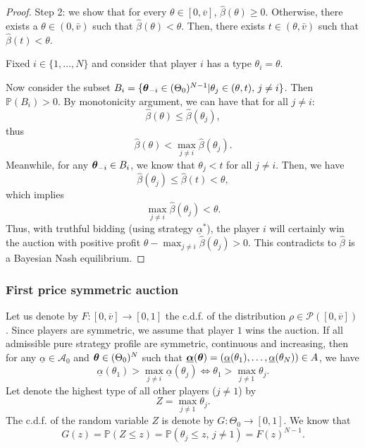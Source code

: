 \begin{proof}
	

	Step 2: we show that for every $\theta \in [0,\overline{v}]$, $\hat{\beta}(\theta) \geq 0$. Otherwise, there exists a $\theta \in (0, \bar{v})$ such that $\hat{\beta}(\theta) < \theta$.
	Then, there exists $t \in (\theta, \bar{v})$ such that  $\hat{\beta}(t) < \theta$.
	
	Fixed $i \in \{1,\ldots,N\}$ and consider that player $i$ has a type $\theta_i = \theta$.
	
	Now consider the subset $B_i = \{ \boldsymbol{\theta}_{-i} \in (\Theta_0)^{N-1} | \theta_j \in (\theta, t), \, j \neq i\}$. Then $\mathbb{P}(B_i) > 0$. By monotonicity argument, we can have that for all $j \neq i$:
	$$
		\hat{\beta}(\theta) \leq \hat{\beta}(\theta_j),
	$$
	thus
	$$
		\hat{\beta}(\theta) < \max_{j \neq i} \hat{\beta}(\theta_j).
	$$
	Meanwhile, for any $\boldsymbol{\theta}_{-i} \in B_i$, we know that $\theta_j < t$ for all $j \neq i$. Then, we have
	$$
		\hat{\beta}(\theta_j) \leq \hat{\beta}(t) < \theta,
	$$
	which implies
	$$
		\max_{j \neq i} \hat{\beta}(\theta_j) < \theta.
	$$
	Thus, with truthful bidding (using strategy $\underline{\alpha}^*$), the player $i$ will certainly win the auction with positive profit $\theta - \max_{j \neq i} \hat{\beta}(\theta_j) > 0$. This contradicts to $\hat{\beta}$ is a Bayesian Nash equilibrium. 
\end{proof}

\subsubsection{First price symmetric auction}

Let us denote by $F: [0, \overline{v}] \to [0,1]$ the c.d.f. of the distribution $\rho \in \mathcal{P}([0, \overline{v}] )$.  Since players are symmetric, we assume that player $1$ wins the auction. If all admissible pure strategy profile are symmetric, continuous and increasing, then for any $\underline{\alpha} \in \mathcal{A}_0$ and $\boldsymbol{\theta} \in (\Theta_0)^N$ such that $\underline{\boldsymbol{\alpha}}(\boldsymbol{\theta}) = (\underline{\alpha}(\theta_1), \ldots, \underline{\alpha}(\theta_N)) \in A$, we have
$$
	\underline{\alpha}(\theta_1) > \max_{j \neq i} \underline{\alpha}(\theta_j) \Longleftrightarrow \theta_1 > \max_{j \neq 1} \theta_j.
$$
Let denote the highest type of all other players ($j \neq 1$) by
$$
Z = \max_{j \neq 1} \theta_j.
$$
The c.d.f. of the random variable $Z$ is denote by $G: \Theta_0 \to [0,1]$. We know that
$$
G(z) = \mathbb{P}(Z \leq z) = \mathbb{P}( \theta_j \leq z, \, j\neq 1) = F(z)^{N-1}.
$$

